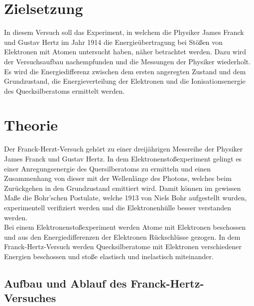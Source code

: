 \section{Zielsetzung}
\label{sec:zielsetzung}

    In diesem Versuch soll das Experiment, in welchem die Physiker James Franck und Gustav Hertz im Jahr 1914 die Energieübertragung bei Stößen von Elektronen mit 
    Atomen untersucht haben, näher betrachtet werden. Dazu wird der Versuchsaufbau nachempfunden und die Messungen der Physiker wiederholt. Es wird die 
    Energiedifferenz zwischen dem ersten angeregten Zustand und dem Grundzustand, die Energieverteilung der Elektronen und die Ionisationsenergie des 
    Quecksilberatoms ermittelt werden. 

\section{Theorie}
\label{sec:Theorie}

    Der Franck-Herzt-Versuch gehört zu einer dreijährigen Messreihe der Physiker James Franck und Gustav Hertz. In dem Elektronenstoßexperiment gelingt es einer
    Anregungsenergie des Quersilberatoms zu ermitteln und einen Zusammenhang von dieser mit der Wellenlänge des Photons, welches beim Zurückgehen in den 
    Grundzustand emittiert wird. Damit können im gewissen Maße die Bohr'schen Postulate, welche 1913 von Niels Bohr aufgestellt wurden, experimentell verifiziert 
    werden und die Elektronenhülle besser verstanden werden. \\
    
    \noindent Bei einem Elektronenstoßexperiment werden Atome mit Elektronen beschossen und aus den Energiedifferenzen der Elektronen Rückschlüsse gezogen. 
    In dem Franck-Hertz-Versuch werden Quecksilberatome mit Elektronen verschiedener Energien beschossen und stoße elastisch und inelastisch miteinander. 


\subsection{Aufbau und Ablauf des Franck-Hertz-Versuches}

    


